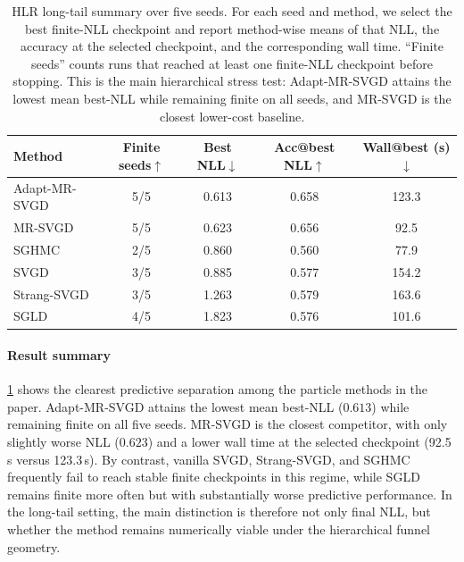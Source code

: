\begin{table}[t]
  \centering
  \scriptsize
  \setlength{\tabcolsep}{4pt}
  \begin{tabular}{lcccc}
    \toprule
    Method & Finite seeds$\uparrow$ & Best NLL$\downarrow$ & Acc@best NLL$\uparrow$ & Wall@best (s)$\downarrow$ \\
    \midrule
    Adapt-MR-SVGD & 5/5 & 0.613 & 0.658 & 123.3 \\
    MR-SVGD & 5/5 & 0.623 & 0.656 & 92.5 \\
    SGHMC & 2/5 & 0.860 & 0.560 & 77.9 \\
    SVGD & 3/5 & 0.885 & 0.577 & 154.2 \\
    Strang-SVGD & 3/5 & 1.263 & 0.579 & 163.6 \\
    SGLD & 4/5 & 1.823 & 0.576 & 101.6 \\
    \bottomrule
  \end{tabular}
  \caption{HLR long-tail summary over five seeds. For each seed and method, we
  select the best finite-NLL checkpoint and report method-wise means of that
  NLL, the accuracy at the selected checkpoint, and the corresponding wall
  time. ``Finite seeds'' counts runs that reached at least one finite-NLL
  checkpoint before stopping. This is the main hierarchical stress test:
  Adapt-MR-SVGD attains the lowest mean best-NLL while remaining finite on all
  seeds, and MR-SVGD is the closest lower-cost baseline.}
  \label{tab:hlr_longtail_summary}
\end{table}

\paragraph{Result summary}
\cref{tab:hlr_longtail_summary} shows the clearest predictive separation among
the particle methods in the paper. Adapt-MR-SVGD attains the lowest mean
best-NLL ($0.613$) while remaining finite on all five seeds. MR-SVGD is the
closest competitor, with only slightly worse NLL ($0.623$) and a lower wall
time at the selected checkpoint (92.5\,s versus 123.3\,s). By contrast,
vanilla SVGD, Strang-SVGD, and SGHMC frequently fail to reach stable finite
checkpoints in this regime, while SGLD remains finite more often but with
substantially worse predictive performance. In the long-tail setting, the main
distinction is therefore not only final NLL, but whether the method remains
numerically viable under the hierarchical funnel geometry.

